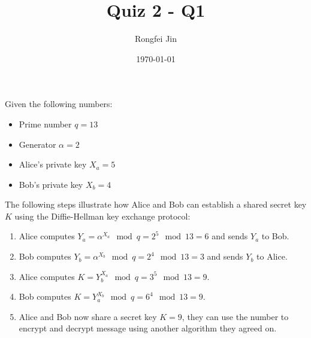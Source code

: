 \documentclass{article}
\author{Rongfei Jin}
\title{Quiz 2 - Q1}
\date{\today}
\begin{document}
Given the following numbers:
\begin{itemize}
\item Prime number $q=13$
\item Generator $\alpha=2$
\item Alice's private key $X_a=5$
\item Bob's private key $X_b=4$
\end{itemize}

The following steps illustrate how Alice and Bob can establish a shared secret key $K$ using the Diffie-Hellman key exchange protocol:

\begin{enumerate}
    \item Alice computes $Y_a = \alpha^{X_a} \mod q = 2^5 \mod 13 = 6$ and sends $Y_a$ to Bob.
    \item Bob computes $Y_b = \alpha^{X_b} \mod q = 2^4 \mod 13 = 3$ and sends $Y_b$ to Alice.
    \item Alice computes $K = Y_b^{X_a} \mod q = 3^5 \mod 13 = 9$.
    \item Bob computes $K = Y_a^{X_b} \mod q = 6^4 \mod 13 = 9$.
    \item Alice and Bob now share a secret key $K=9$, they can use the number to encrypt and decrypt message using another algorithm they agreed on.
\end{enumerate}
\end{document}
